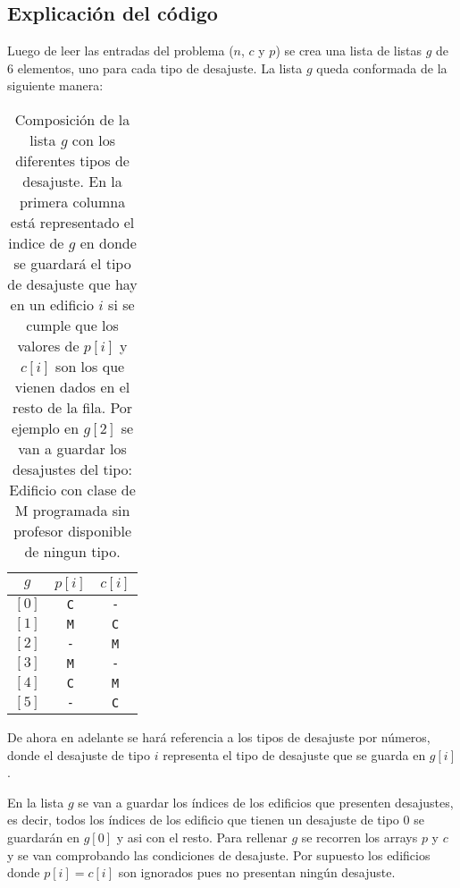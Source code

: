 \documentclass[11pt]{article}
\begin{document}
    \subsection{Explicación del código}
    Luego de leer las entradas del problema ($n$, $c$ y $p$) se crea una lista de listas $g$ de 6 elementos, uno para
    cada tipo de desajuste. La lista $g$ queda conformada de la siguiente manera:

    \begin{table}[h]
        \centering
        \label{Tabla_de_Desajustes}
        \begin{tabular}{|c|c|c|}
            \hline \textbf{$g$} & \textbf{$p[i]$} & \textbf{$c[i]$}\\ 
            \hline $[0]$ & \texttt{C} & \texttt{-} \\
            \hline $[1]$ & \texttt{M} & \texttt{C} \\
            \hline $[2]$ & \texttt{-} & \texttt{M} \\
            \hline $[3]$ & \texttt{M} & \texttt{-} \\
            \hline $[4]$ & \texttt{C} & \texttt{M} \\
            \hline $[5]$ & \texttt{-} & \texttt{C} \\
            \hline
        \end{tabular}
        \caption{Composición de la lista $g$ con los diferentes tipos de desajuste. En la primera columna está
        representado el indice de $g$ en donde se guardará el tipo de desajuste que hay en un edificio $i$ si se
        cumple que los valores de $p[i]$ y $c[i]$ son los que vienen dados en el resto de la fila. Por ejemplo en
        $g[2]$ se van a guardar los desajustes del tipo: Edificio con clase de M programada sin profesor
        disponible de ningun tipo.}
    \end{table}

    De ahora en adelante se hará referencia a los tipos de desajuste por números, donde el desajuste de tipo $i$
    representa el tipo de desajuste que se guarda en $g[i]$.

    En la lista $g$ se van a guardar los índices de los edificios que presenten desajustes, es decir, todos los
    índices de los edificio que tienen un desajuste de tipo 0 se guardarán en $g[0]$ y asi con el resto. Para
    rellenar $g$ se recorren los arrays $p$ y $c$ y se van comprobando las condiciones de desajuste. Por supuesto
    los edificios donde $p[i] = c[i]$ son ignorados pues no presentan ningún desajuste.
\end{document}
